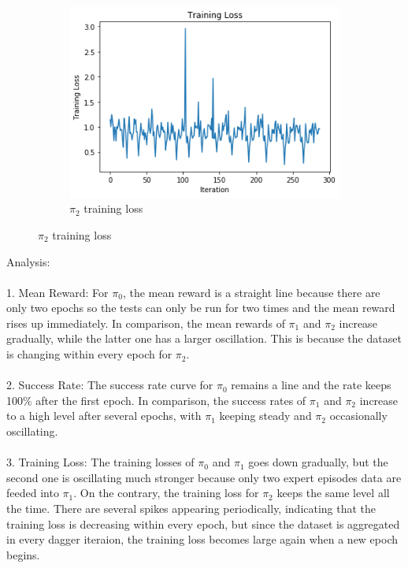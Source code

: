 \documentclass{article}
\begin{document}
\begin{figure}[h!]
\begin{subfigure}[b]{0.3\textwidth}
         	\includegraphics[width=\textwidth]
         	{images/training_loss_2}
         	\caption{$\pi_2$ training loss}
         	\label{fig:pi_2_reward}
     	\end{subfigure}
	\end{figure}
	
	\noindent
	Analysis:\\\\
	1. Mean Reward: For $\pi_0$, the mean reward is a straight line because there are only two epochs so the tests can only be run for two times and the mean reward rises up immediately. In comparison, the mean rewards of $\pi_1$ and $\pi_2$ increase gradually, while the latter one has a larger oscillation. This is because the dataset is changing within every epoch for $\pi_2$.\\\\
	2. Success Rate: The success rate curve for $\pi_0$ remains a line and the rate keeps 100\% after the first epoch. In comparison, the success rates of $\pi_1$ and $\pi_2$ increase to a high level after several epochs, with $\pi_1$ keeping steady and $\pi_2$ occasionally oscillating.\\\\
	3. Training Loss: The training losses of $\pi_0$ and $\pi_1$ goes down gradually, but the second one is oscillating much stronger because only two expert episodes data are feeded into $\pi_1$. On the contrary, the training loss for $\pi_2$ keeps the same level all the time. There are several spikes appearing periodically, indicating that the training loss is decreasing within every epoch, but since the dataset is aggregated in every dagger iteraion, the training loss becomes large again when a new epoch begins.
    
\end{document}
